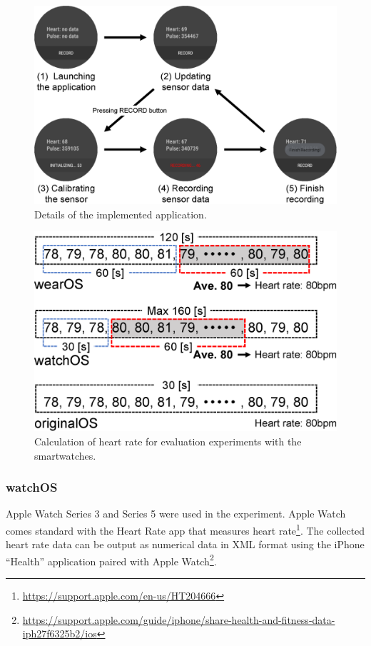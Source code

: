 \documentclass[sigchi,authordraft]{acmart}
\begin{document}
\begin{figure}[!t]
  \centering
  \includegraphics[width=1\linewidth]{figures/app.eps}
  \caption{Details of the implemented application.}
  \label{fig:app}
\end{figure}

\begin{figure}[!t]
  \centering
  \includegraphics[width=1\linewidth]{figures/calculate_heart_rate.eps}
  \caption{Calculation of heart rate for evaluation experiments with the smartwatches.}
  \label{fig:calculating_heart_rate}
\end{figure}

\subsubsection{watchOS}
\label{subsec:applewatch}
Apple Watch Series 3 and Series 5 were used in the experiment. Apple Watch comes standard with the Heart Rate app that measures heart rate\footnote{\url{https://support.apple.com/en-us/HT204666}}. The collected heart rate data can be output as numerical data in XML format using the iPhone ``Health'' application paired with Apple Watch\footnote{\url{https://support.apple.com/guide/iphone/share-health-and-fitness-data-iph27f6325b2/ios}}.\par
\end{document}
